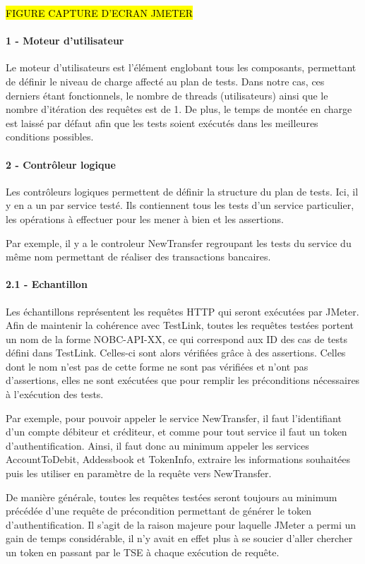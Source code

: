 	\hl{FIGURE CAPTURE D'ECRAN JMETER}
	
	\paragraph{1 - Moteur d'utilisateur}
	Le moteur d'utilisateurs est l'élément englobant tous les composants, permettant de définir le niveau de charge affecté au plan de tests. Dans notre cas, ces derniers étant fonctionnels, le nombre de threads (utilisateurs) ainsi que le nombre d'itération des requêtes est de 1. De plus, le temps de montée en charge est laissé par défaut afin que les tests soient exécutés dans les meilleures conditions possibles.

	\paragraph{2 - Contrôleur logique}
	Les contrôleurs logiques permettent de définir la structure du plan de tests. Ici, il y en a un par service testé. Ils contiennent tous les tests d'un service particulier, les opérations à effectuer pour les mener à bien et les assertions.
	
	Par exemple, il y a le controleur NewTransfer regroupant les tests du service du même nom permettant de réaliser des transactions bancaires.
	
	\paragraph{2.1 - Echantillon}
	Les échantillons représentent les requêtes HTTP qui seront exécutées par JMeter. Afin de maintenir la cohérence avec TestLink, toutes les requêtes testées portent un nom de la forme NOBC-API-XX, ce qui correspond aux ID des cas de tests défini dans TestLink. Celles-ci sont alors vérifiées grâce à des assertions. Celles dont le nom n'est pas de cette forme ne sont pas vérifiées et n'ont pas d'assertions, elles ne sont exécutées que pour remplir les préconditions nécessaires à l'exécution des tests.
	
	Par exemple, pour pouvoir appeler le service NewTransfer, il faut l'identifiant d'un compte débiteur et créditeur, et comme pour tout service il faut un token d'authentification. Ainsi, il faut donc au minimum appeler les services AccountToDebit, Addessbook et TokenInfo, extraire les informations souhaitées puis les utiliser en paramètre de la requête vers NewTransfer.
	
	De manière générale, toutes les requêtes testées seront toujours au minimum précédée d'une requête de précondition permettant de générer le token d'authentification. Il s'agit de la raison majeure pour laquelle JMeter a permi un gain de temps considérable, il n'y avait en effet plus à se soucier d'aller chercher un token en passant par le TSE à chaque exécution de requête.
	

